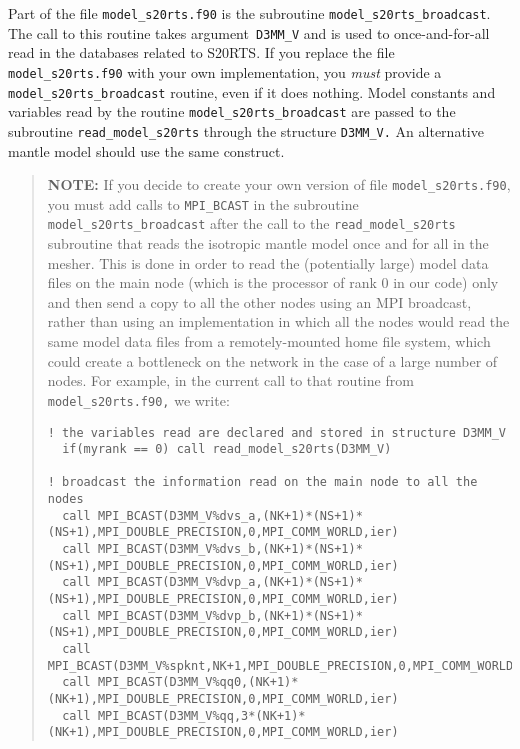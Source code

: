 Part of the file \texttt{model\_s20rts.f90} is the subroutine
\texttt{model\_s20rts\_broadcast}.
The call to this routine takes argument\texttt{ D3MM\_V} and is used
to once-and-for-all read in the databases related to S20RTS. If you
replace the file \texttt{model\_s20rts.f90} with your own implementation,
you \textit{must} provide a \texttt{model\_s20rts\_broadcast} routine,
even if it does nothing. Model constants and variables read by the
routine \texttt{model\_s20rts\_broadcast} are passed to the subroutine
\texttt{read\_model\_s20rts} through the structure \texttt{D3MM\_V.}
An alternative mantle model should use the same construct.\newline


\begin{quote}
\textbf{NOTE:} If you decide to create your own version of file \texttt{model\_s20rts.f90},
you must add calls to \texttt{MPI\_BCAST} in the subroutine \texttt{model\_s20rts\_broadcast}
after the call to the \texttt{read\_model\_s20rts} subroutine that
reads the isotropic mantle model once and for all in the mesher. This
is done in order to read the (potentially large) model data files
on the main node (which is the processor of rank 0 in our code)
only and then send a copy to all the other nodes using an MPI broadcast,
rather than using an implementation in which all the nodes would read
the same model data files from a remotely-mounted home file system,
which could create a bottleneck on the network in the case of a large
number of nodes. For example, in the current call to that routine
from \texttt{model\_s20rts.f90,} we write:\newline

{\footnotesize
\begin{verbatim}
! the variables read are declared and stored in structure D3MM_V
  if(myrank == 0) call read_model_s20rts(D3MM_V)

! broadcast the information read on the main node to all the nodes
  call MPI_BCAST(D3MM_V%dvs_a,(NK+1)*(NS+1)*(NS+1),MPI_DOUBLE_PRECISION,0,MPI_COMM_WORLD,ier)
  call MPI_BCAST(D3MM_V%dvs_b,(NK+1)*(NS+1)*(NS+1),MPI_DOUBLE_PRECISION,0,MPI_COMM_WORLD,ier)
  call MPI_BCAST(D3MM_V%dvp_a,(NK+1)*(NS+1)*(NS+1),MPI_DOUBLE_PRECISION,0,MPI_COMM_WORLD,ier)
  call MPI_BCAST(D3MM_V%dvp_b,(NK+1)*(NS+1)*(NS+1),MPI_DOUBLE_PRECISION,0,MPI_COMM_WORLD,ier)
  call MPI_BCAST(D3MM_V%spknt,NK+1,MPI_DOUBLE_PRECISION,0,MPI_COMM_WORLD,ier)
  call MPI_BCAST(D3MM_V%qq0,(NK+1)*(NK+1),MPI_DOUBLE_PRECISION,0,MPI_COMM_WORLD,ier)
  call MPI_BCAST(D3MM_V%qq,3*(NK+1)*(NK+1),MPI_DOUBLE_PRECISION,0,MPI_COMM_WORLD,ier)
\end{verbatim}
}
\end{quote}


